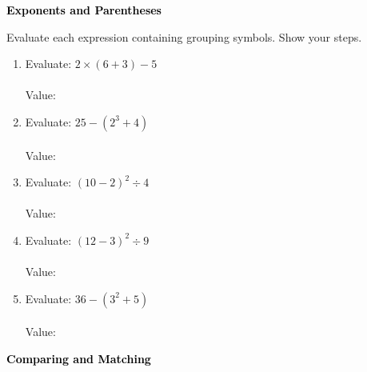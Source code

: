\documentclass[12pt, letterpaper, fleqn]{article}
\newcommand{\blanklong}{\underline{\hspace{6.5cm}}}
\begin{document}
\newpage

\begin{tcolorbox}[colback=black!10]
\large\textcolor{black}{\textbf{Exponents and Parentheses}}
\end{tcolorbox}

\noindent
Evaluate each expression containing grouping symbols. Show your steps.

\vspace{3mm}

\begin{enumerate}[itemsep=1cm, leftmargin=0.6cm]

\item Evaluate: $2 \times (6 + 3) - 5$ \\ \\
Value: \blanklong

\vspace{1cm}

\item Evaluate: $25 - (2^3 + 4)$ \\ \\
Value: \blanklong

\vspace{1cm}

\item Evaluate: $(10 - 2)^2 \div 4$ \\ \\
Value: \blanklong

\vspace{1cm}

\item Evaluate: $(12 - 3)^2 \div 9$ \\ \\
Value: \blanklong

\vspace{1cm}

\item Evaluate: $36 - (3^2 + 5)$ \\ \\
Value: \blanklong
\vspace{1cm}

\end{enumerate}

\newpage

\begin{tcolorbox}[colback=black!10]
\large\textcolor{black}{\textbf{Comparing and Matching}}
\end{tcolorbox}
\end{document}
